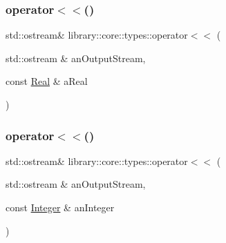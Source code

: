 \mbox{\label{namespacelibrary_1_1core_1_1types_af9123a41f1061b37fc719e25761f33a2}} 
\subsubsection{\texorpdfstring{operator$<$$<$()}{operator<<()}\hspace{0.1cm}{\footnotesize\ttfamily [1/2]}}
{\footnotesize\ttfamily std\+::ostream\& library\+::core\+::types\+::operator$<$$<$ (\begin{DoxyParamCaption}\item[{std\+::ostream \&}]{an\+Output\+Stream,  }\item[{const \hyperlink{classlibrary_1_1core_1_1types_1_1_real}{Real} \&}]{a\+Real }\end{DoxyParamCaption})}

\mbox{\label{namespacelibrary_1_1core_1_1types_a8fcd2efaf239710c5a837397cdb69968}} 
\subsubsection{\texorpdfstring{operator$<$$<$()}{operator<<()}\hspace{0.1cm}{\footnotesize\ttfamily [2/2]}}
{\footnotesize\ttfamily std\+::ostream\& library\+::core\+::types\+::operator$<$$<$ (\begin{DoxyParamCaption}\item[{std\+::ostream \&}]{an\+Output\+Stream,  }\item[{const \hyperlink{classlibrary_1_1core_1_1types_1_1_integer}{Integer} \&}]{an\+Integer }\end{DoxyParamCaption})}


